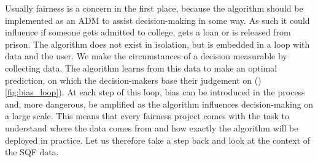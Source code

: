 Usually fairness is a concern in the first place, because the algorithm should be implemented as an ADM to assist decision-making in some way. As such it could influence if someone gets admitted to college, gets a loan or is released from prison. The algorithm does not exist in isolation, but is embedded in a loop with data and the user.
We make the circumstances of a decision measurable by collecting data. The algorithm learns from this data to make an optimal prediction, on which the decision-makers base their judgement on ()\autoref{fig:bias_loop}). At each step of this loop, bias can be introduced in the process and, more dangerous, be amplified as the algorithm influences decision-making on a large scale.
This means that every fairness project comes with the task to understand where the data comes from and how exactly the algorithm will be deployed in practice. Let us therefore take a step back and look at the context of the SQF data.







